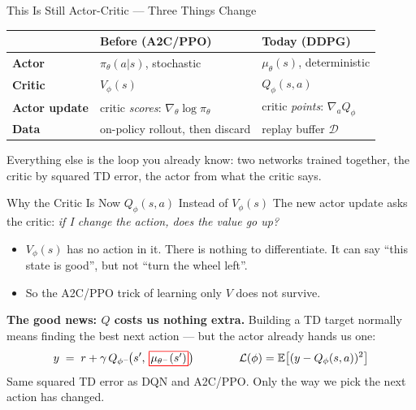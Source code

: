 
\begin{frame}{This Is Still Actor-Critic --- Three Things Change}
\vspace{-0.2em}
\begin{center}
\small
\renewcommand{\arraystretch}{1.5}
\begin{tabular}{p{} p{} p{}}
\hline
 & \textbf{Before (A2C/PPO)} & \textbf{Today (DDPG)} \\
\hline
\textbf{Actor} & $\pi_\theta(a|s)$, stochastic & $\mu_\theta(s)$, deterministic \\
\textbf{Critic} & $V_\phi(s)$ & $Q_\phi(s,a)$ \\
\textbf{Actor update} & critic \emph{scores}: $\nabla_\theta \log \pi_\theta$ & critic \emph{points}: $\nabla_a Q_\phi$ \\
\textbf{Data} & on-policy rollout, then discard & replay buffer $\mathcal{D}$ \\
\hline
\end{tabular}
\end{center}
\vspace{0.8em}
\centering
Everything else is the loop you already know: two networks trained together, the critic by squared TD error, the actor from what the critic says.
\end{frame}

\begin{frame}{Why the Critic Is Now $Q_\phi(s,a)$ Instead of $V_\phi(s)$}
\vspace{0.6em}
The new actor update asks the critic: \emph{if I change the action, does the value go up?}
\vspace{0.4em}
\begin{itemize}
    \setlength{\itemsep}{0.5em}
    \item $V_\phi(s)$ has no action in it. There is nothing to differentiate. It can say ``this state is good'', but not ``turn the wheel left''.
    \item So the A2C/PPO trick of learning only $V$ does not survive.
\end{itemize}
\pause
\vspace{0.9em}

\textbf{The good news: $Q$ costs us nothing extra.} Building a TD target normally means finding the best next action --- but the actor already hands us one:
\[
y \;=\; r + \gamma\, Q_{\phi^{-}}\!\big(s',\, \rbox{\mu_{\theta^{-}}(s')}\big)
\qquad\qquad
\mathcal{L}(\phi) = \mathbb{E}\big[(y - Q_\phi(s,a))^2\big]
\]
\vspace{0.2em}
\centering
Same squared TD error as DQN and A2C/PPO. Only the way we pick the next action has changed.
\end{frame}
